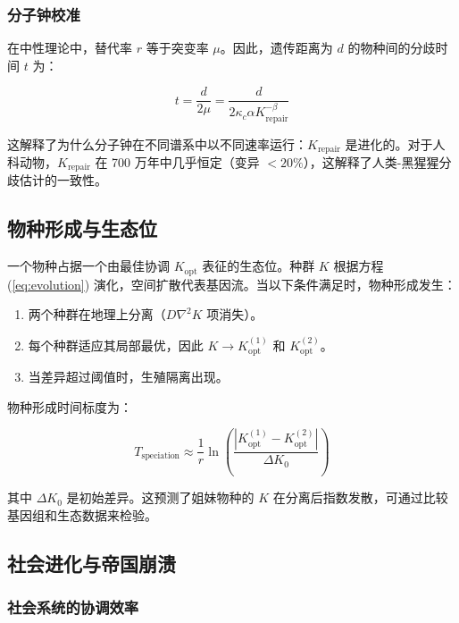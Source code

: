 \documentclass[12pt,a4paper]{article}
\theoremstyle{remark}
\newcommand{\Keffopt}{K_{\mathrm{opt}}}
\newcommand{\kappac}{\kappa_c}
\begin{document}
	\subsubsection{分子钟校准}
	
	在中性理论中，替代率 $r$ 等于突变率 $\mu$。因此，遗传距离为 $d$ 的物种间的分歧时间 $t$ 为：
	
	\begin{equation}
		t = \frac{d}{2\mu} = \frac{d}{2\kappac \alpha K_{\text{repair}}^{-\beta}}
		\label{eq:molecular-clock}
	\end{equation}
	
	这解释了为什么分子钟在不同谱系中以不同速率运行：$K_{\text{repair}}$ 是进化的。对于人科动物，$K_{\text{repair}}$ 在 700 万年中几乎恒定（变异 $<20\%$），这解释了人类-黑猩猩分歧估计的一致性。
	
	\subsection{物种形成与生态位}
	
	一个物种占据一个由最佳协调 $\Keffopt$ 表征的生态位。种群 $K$ 根据方程 (\ref{eq:evolution}) 演化，空间扩散代表基因流。当以下条件满足时，物种形成发生：
	
	\begin{enumerate}
		\item 两个种群在地理上分离（$D \nabla^2 K$ 项消失）。
		\item 每个种群适应其局部最优，因此 $K \to \Keffopt^{(1)}$ 和 $\Keffopt^{(2)}$。
		\item 当差异超过阈值时，生殖隔离出现。
	\end{enumerate}
	
	物种形成时间标度为：
	
	\begin{equation}
		T_{\text{speciation}} \approx \frac{1}{r} \ln\left( \frac{|\Keffopt^{(1)} - \Keffopt^{(2)}|}{\Delta K_0} \right)
		\label{eq:speciation-time}
	\end{equation}
	
	其中 $\Delta K_0$ 是初始差异。这预测了姐妹物种的 $K$ 在分离后指数发散，可通过比较基因组和生态数据来检验。
	
	\subsection{社会进化与帝国崩溃}
	\label{subsec:social}
	
	\subsubsection{社会系统的协调效率}
	
\end{document}
